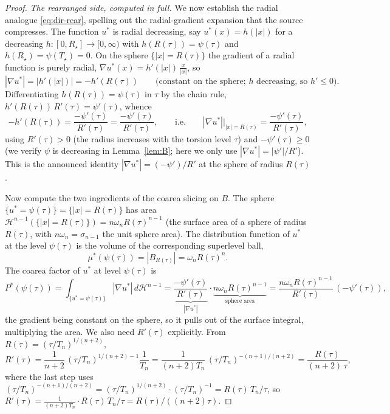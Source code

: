 \documentclass[11pt]{amsart}
\theoremstyle{definition}
\newcommand{\abs}[1]{\left|#1\right|}
\newcommand{\dH}{\,d\mathcal H^{n-1}}
\begin{document}
\begin{proof}
\emph{The rearranged side, computed in full.} We now establish the radial
analogue \eqref{eq:dir-rear}, spelling out the radial-gradient expansion
that the source compresses. The function $u^*$ is radial decreasing, say
$u^*(x)=h(\abs x)$ for a decreasing $h:[0,R_\star]\to[0,\infty)$ with
$h(R(\tau))=\psi(\tau)$ and $h(R_\star)=\psi(T_\star)=0$. On the sphere
$\{\abs x=R(\tau)\}$ the gradient of a radial function is purely radial,
$\nabla u^*(x)=h'(\abs x)\,\tfrac{x}{\abs x}$, so
\begin{equation}\label{eq:radgrad}
  \abs{\nabla u^*}=\abs{h'(\abs x)}=-h'(R(\tau))\qquad
  \text{(constant on the sphere; $h$ decreasing, so $h'\le0$).}
\end{equation}
Differentiating $h(R(\tau))=\psi(\tau)$ in $\tau$ by the chain rule,
$h'(R(\tau))\,R'(\tau)=\psi'(\tau)$, whence
\begin{equation}\label{eq:hprime}
  -h'(R(\tau))=\frac{-\psi'(\tau)}{R'(\tau)}
  =\frac{-\psi'(\tau)}{R'(\tau)},
  \qquad\text{i.e.}\qquad
  \abs{\nabla u^*}\big|_{\abs x=R(\tau)}=\frac{-\psi'(\tau)}{R'(\tau)} ,
\end{equation}
using $R'(\tau)>0$ (the radius increases with the torsion level $\tau$) and
$-\psi'(\tau)\ge0$ (we verify $\psi$ is decreasing in Lemma~\ref{lem:B}; here
we only use $\abs{\nabla u^*}=\abs{\psi'}/R'$). This is the announced
identity $\abs{\nabla u^*}=(-\psi')/R'$ at the sphere of radius $R(\tau)$.

Now compute the two ingredients of the coarea slicing on $B$. The sphere
$\{u^*=\psi(\tau)\}=\{\abs x=R(\tau)\}$ has area
$\mathcal H^{n-1}(\{\abs x=R(\tau)\})=n\omega_n R(\tau)^{n-1}$ (the surface
area of a sphere of radius $R(\tau)$, with $n\omega_n=\sigma_{n-1}$ the unit
sphere area). The distribution function of $u^*$ at the level $\psi(\tau)$ is
the volume of the corresponding superlevel ball,
\begin{equation}\label{eq:mustar}
  \mu^*(\psi(\tau))=\abs{B_{R(\tau)}}=\omega_n R(\tau)^n .
\end{equation}
The coarea factor of $u^*$ at level $\psi(\tau)$ is
\begin{equation}\label{eq:Pstar}
  P^*(\psi(\tau))
  =\int_{\{u^*=\psi(\tau)\}}\abs{\nabla u^*}\dH
  =\underbrace{\frac{-\psi'(\tau)}{R'(\tau)}}_{\abs{\nabla u^*}}
   \cdot\underbrace{n\omega_n R(\tau)^{n-1}}_{\text{sphere area}}
  =\frac{n\omega_n R(\tau)^{n-1}}{R'(\tau)}\,(-\psi'(\tau)),
\end{equation}
the gradient being constant on the sphere, so it pulls out of the surface
integral, multiplying the area. We also need $R'(\tau)$ explicitly. From
$R(\tau)=(\tau/T_n)^{1/(n+2)}$,
\begin{equation}\label{eq:Rprime}
  R'(\tau)=\frac{1}{n+2}\,(\tau/T_n)^{1/(n+2)-1}\frac1{T_n}
  =\frac{1}{(n+2)T_n}\,(\tau/T_n)^{-(n+1)/(n+2)}
  =\frac{R(\tau)}{(n+2)\,\tau},
\end{equation}
where the last step uses $(\tau/T_n)^{-(n+1)/(n+2)}
=(\tau/T_n)^{1/(n+2)}\cdot(\tau/T_n)^{-1}=R(\tau)\,T_n/\tau$, so
$R'(\tau)=\tfrac{1}{(n+2)T_n}\cdot R(\tau)\,T_n/\tau=R(\tau)/((n+2)\tau)$.


\end{proof}
\end{document}
